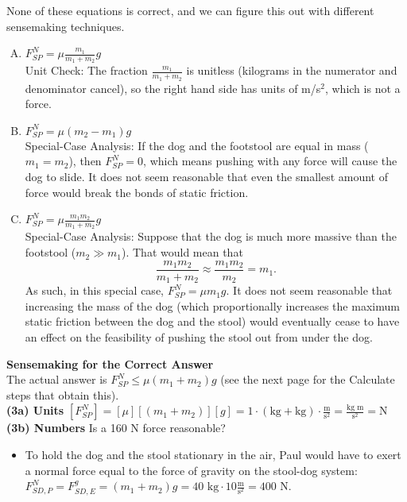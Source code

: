 \documentclass[]{article}
\begin{document}
\newpage
\begin{TeacherMargin}
\noindent None of these equations is correct, and we can figure this out with different sensemaking techniques.
\begin{enumerate}[(A)]
	\item $F^{N}_{SP} = \mu\frac{m_{1}}{m_{1}+m_{2}}g$ \\
	Unit Check: The fraction $\frac{m_{1}}{m_{1}+m_{2}}$ is unitless (kilograms in the numerator and denominator cancel), so the right hand side has units of m/s$^{2}$, which is not a force.
	\item $F^{N}_{SP} = \mu(m_{2}-m_{1})g$ \\
	Special-Case Analysis: If the dog and the footstool are equal in mass ($m_{1}=m_{2}$), then $F^{N}_{SP} = 0$, which means pushing with any force will cause the dog to slide. It does not seem reasonable that even the smallest amount of force would break the bonds of static friction.
	\item $F^{N}_{SP} = \mu\frac{m_{1}m_{2}}{m_{1}+m_{2}}g$ \\
	Special-Case Analysis: Suppose that the dog is much more massive than the footstool ($m_{2} \gg m_{1}$). That would mean that
	\[
	\frac{m_{1}m_{2}}{m_{1}+m_{2}} \approx \frac{m_{1}m_{2}}{m_{2}} = m_{1}.
	\]
	As such, in this special case, $F^{N}_{SP} = \mu m_{1}g$. It does not seem reasonable that increasing the mass of the dog (which proportionally increases the maximum static friction between the dog and the stool) would eventually cease to have an effect on the feasibility of pushing the stool out from under the dog.
\end{enumerate}
\textbf{Sensemaking for the Correct Answer} \\
The actual answer is $F^{N}_{SP} \leq \mu(m_{1}+m_{2})g$ (see the next page for the Calculate steps that obtain this). \\
\noindent\textbf{(3a) Units} $\left[F^{N}_{SP}\right] = \left[\mu\right]\left[(m_{1}+m_{2})\right]\left[g\right] = 1 \cdot (\text{kg}+\text{kg}) \cdot \frac{\text{m}}{\text{s}^{2}} = \frac{\text{kg m}}{\text{s}^{2}} = \text{N}$ \\
\textbf{(3b) Numbers} Is a 160 N force reasonable?
\begin{itemize}
	\item To hold the dog and the stool stationary in the air, Paul would have to exert a normal force equal to the force of gravity on the stool-dog system: $F^{N}_{SD,P} = F^{g}_{SD,E} = (m_{1}+m_{2})g = 40\text{ kg} \cdot 10\frac{\text{m}}{\text{s}^{2}} = 400\text{ N}$. \\

\end{itemize}
\end{TeacherMargin}
\end{document}
